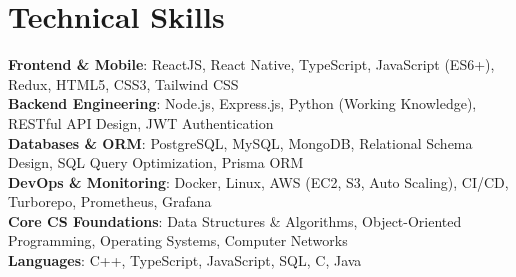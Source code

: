 \documentclass[10pt,a4paper]{article}
\begin{document}
\section{Technical Skills}
\begin{itemize}[leftmargin=0.15in, label={}]
    \small{\item{
     \textbf{Frontend \& Mobile}{: ReactJS, React Native, TypeScript, JavaScript (ES6+), Redux, HTML5, CSS3, Tailwind CSS} \\ \vspace{1pt}
     \textbf{Backend Engineering}{: Node.js, Express.js, Python (Working Knowledge), RESTful API Design, JWT Authentication} \\ \vspace{1pt}
     \textbf{Databases \& ORM}{: PostgreSQL, MySQL, MongoDB, Relational Schema Design, SQL Query Optimization, Prisma ORM} \\ \vspace{1pt}
     \textbf{DevOps \& Monitoring}{: Docker, Linux, AWS (EC2, S3, Auto Scaling), CI/CD, Turborepo, Prometheus, Grafana} \\ \vspace{1pt}
     \textbf{Core CS Foundations}{: Data Structures \& Algorithms, Object-Oriented Programming, Operating Systems, Computer Networks} \\ \vspace{1pt}
     \textbf{Languages}{: C++, TypeScript, JavaScript, SQL, C, Java}
    }}
\end{itemize}
\end{document}
